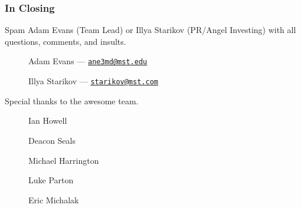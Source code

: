 \documentclass[handout,xclolor=dvipsnames]{beamer}    %
\begin{document}
\begin{darkframes}
    \begin{frame}
        \frametitle{In Closing}

        Spam Adam Evans (Team Lead) or Illya Starikov (PR/Angel Investing) with all questions, comments, and insults.

        \begin{center}
            \begin{description}
                \item[\faComment] Adam Evans --- \href{mailto:ane3md@mst.edu}{\nolinkurl{ane3md@mst.edu}}
                \item[\faComment] Illya Starikov --- \href{mailto:starikov@mst.edu}{\nolinkurl{starikov@mst.com}}
            \end{description}
        \end{center}

        Special thanks to the awesome team.

        \begin{center}
            \begin{description}
                \item[\faUser] Ian Howell
                \item[\faUser] Deacon Seals
                \item[\faUser] Michael Harrington
                \item[\faUser] Luke Parton
                \item[\faUser] Eric Michalak
            \end{description}
        \end{center}

    \end{frame}
\end{darkframes}
\end{document}
